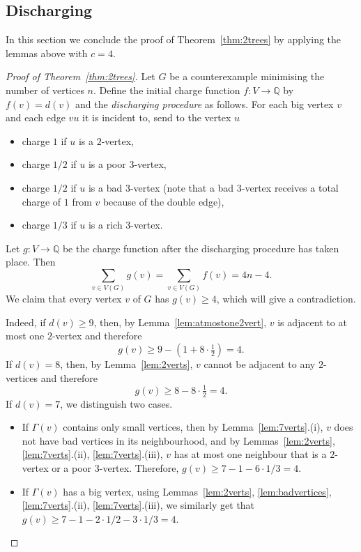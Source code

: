 \documentclass[11pt, reqno, a4paper]{article}
\theoremstyle{definition}
\numberwithin{equation}{section}
\newcommand{\Q}{\mathbb{Q}}
\renewcommand{\geq}{\geqslant}
\begin{document}
\subsection{Discharging}\label{subsec:discharge}
In this section we conclude the proof of Theorem~\ref{thm:2trees} by applying the lemmas above with $c = 4$.
\begin{proof}[Proof of Theorem~\ref{thm:2trees}] 
Let $G$ be a counterexample minimising the number of vertices $n$.
Define the initial charge function $f\colon V \to \Q$ by $f(v) = d(v)$ and the \emph{discharging procedure} as follows.
For each big vertex $v$ and each edge $vu$ it is incident to, send to the vertex $u$
\begin{itemize}[noitemsep]
\item charge $1$ if $u$ is a $2$-vertex,
\item charge $1/2$ if $u$ is a poor $3$-vertex, 
\item charge $1/2$ if $u$ is a bad $3$-vertex (note that a bad $3$-vertex receives a total charge of $1$ from $v$ because of the double edge), 
\item charge $1/3$ if $u$ is a rich $3$-vertex.
\end{itemize}
Let $g\colon V\to \Q$ be the charge function after the discharging procedure has taken place.
Then 
\begin{equation*}
\sum_{v\in V(G)} g(v) = \sum_{v\in V(G)} f(v) = 4 n -  4.
\end{equation*}
We claim that every vertex $v$ of $G$ has $g(v) \geq 4$, which will give a contradiction.

Indeed, 
if $d(v)\geq 9$, then, by Lemma~\ref{lem:atmostone2vert}, $v$ is adjacent to at most one $2$-vertex and therefore
\begin{equation*}
g(v) \geq 9 - (1 + 8\cdot \tfrac{1}{2}) = 4.
\end{equation*}
If $d(v) = 8$, then, by Lemma~\ref{lem:2verts}, $v$ cannot be adjacent to any $2$-vertices and therefore
\begin{equation*}
g(v) \geq 8 - 8\cdot\tfrac{1}{2}  = 4.
\end{equation*}
If $d(v) = 7$, we distinguish two cases.
\begin{itemize}[noitemsep]
\item If $\Gamma(v)$ contains only small vertices, then by Lemma~\ref{lem:7verts}.(i), $v$ does not have bad vertices in its neighbourhood, and by Lemmas~\ref{lem:2verts}, \ref{lem:7verts}.(ii), \ref{lem:7verts}.(iii), $v$ has at most one neighbour that is a $2$-vertex or a poor $3$-vertex.
Therefore,
$g(v) \geq 7- 1 - 6\cdot 1/3 = 4$.
\item If $\Gamma(v)$ has a big vertex, using Lemmas~\ref{lem:2verts}, \ref{lem:badvertices}, \ref{lem:7verts}.(ii), \ref{lem:7verts}.(iii), we similarly get that
$g(v) \geq 7- 1 - 2\cdot 1/2 - 3\cdot 1/3 =4$.
\end{itemize}


\end{proof}
\end{document}
